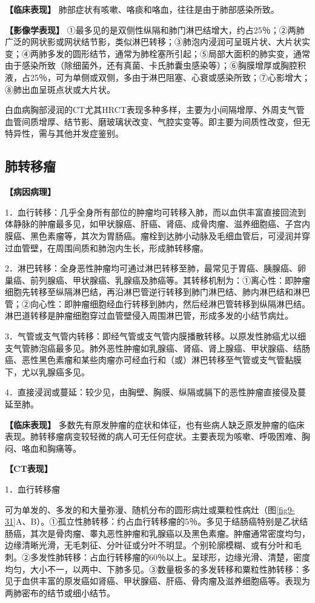 \textbf{【临床表现】}
肺部症状有咳嗽、咯痰和咯血，往往是由于肺部感染所致。

\textbf{【影像学表现】}
①最多见的是双侧性纵隔和肺门淋巴结增大，约占25％；②两肺广泛的网状影或网状结节影，类似淋巴转移；③肺泡内浸润可呈斑片状、大片状实变；④两肺多发的圆形结节，通常为肺栓塞所引起；⑤局部大面积的肺实变，通常由于感染所致（除细菌外，还有真菌、卡氏肺囊虫感染等）；⑥胸膜增厚或胸腔积液，占25％，可为单侧或双侧，多由于淋巴阻塞、心衰或感染所致；⑦心影增大；⑧肺出血呈斑点状或大片状。

白血病胸部浸润的CT尤其HRCT表现多种多样，主要为小间隔增厚、外周支气管血管间质增厚、结节影、磨玻璃状改变、气腔实变等。即主要为间质性改变，但无特异性，需与其他并发症鉴别。

\subsection{肺转移瘤}

\textbf{【病因病理】}

1．血行转移：几乎全身所有部位的肿瘤均可转移入肺，而以血供丰富直接回流到体静脉的肿瘤最多见，如甲状腺癌、肝癌、肾癌、成骨肉瘤、滋养细胞癌、子宫内膜癌、黑色素瘤等，其次为胃肠癌。瘤栓到达肺小动脉及毛细血管后，可浸润并穿过血管壁，在周围间质和肺泡内生长，形成肺转移瘤。

2．淋巴转移：全身恶性肿瘤均可通过淋巴转移至肺，最常见于胃癌、胰腺癌、卵巢癌、前列腺癌、甲状腺癌、乳腺癌及肺癌等。其转移机制为：①离心性：即肿瘤细胞先转移至纵隔淋巴结，再沿淋巴管逆行转移到肺门淋巴结、肺内淋巴结和淋巴管；②向心性：即肿瘤细胞经血行转移到肺内，然后经淋巴管转移到纵隔淋巴结。淋巴道转移是肿瘤细胞穿过血管壁侵入周围淋巴管，形成多发的小结节病灶。

3．气管或支气管内转移：即经气管或支气管内膜播散转移。以原发性肺癌尤以细支气管肺泡癌最多见。肺外恶性肿瘤如乳腺癌、肾癌、肾上腺癌、甲状腺癌、结肠癌、恶性黑色素瘤和某些肉瘤亦可经血行和（或）淋巴转移至气管或支气管黏膜下，尤以乳腺癌多见。

4．直接浸润或蔓延：较少见，由胸壁、胸膜、纵隔或膈下的恶性肿瘤直接侵及蔓延至肺。

\textbf{【临床表现】}
多数先有原发肿瘤的症状和体征，也有些病人缺乏原发肿瘤的临床表现。肺转移瘤病变较轻微的病人可无任何症状。主要表现为咳嗽、呼吸困难、胸闷、咯血和胸痛等。

\textbf{【CT表现】}

1．血行转移瘤

可为单发的、多发的和大量弥漫、随机分布的圆形病灶或粟粒性病灶（图\ref{fig9-31}A、B）。①孤立性肺转移：约占血行转移瘤的5％。多见于结肠癌特别是乙状结肠癌，其次是骨肉瘤、睾丸恶性肿瘤和乳腺癌以及黑色素瘤。肿瘤通常密度均匀，边缘清晰光滑，无毛刺征、分叶征或分叶不明显。个别轮廓模糊、或有分叶和毛刺。②多发性肺转移：占血行转移瘤的60％以上。呈球形，边缘光滑、清楚，密度均匀，大小不一，以两中、下肺多见。③数量极多的多发转移和粟粒性肺转移：多见于血供丰富的原发癌如肾癌、甲状腺癌、肝癌、骨肉瘤及滋养细胞癌等。表现为两肺密布的结节或细小结节。

